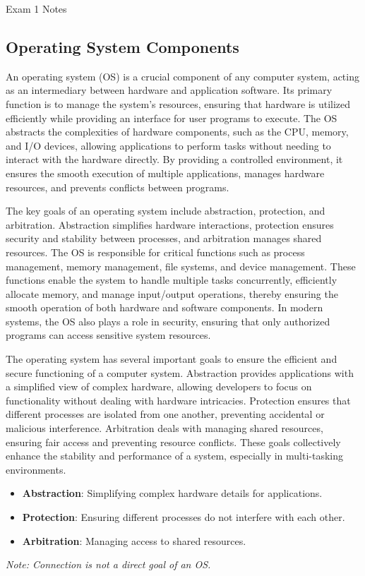 \begin{examnotes}{Exam 1 Notes}
    \subsection*{Operating System Components}

    An operating system (OS) is a crucial component of any computer system, acting as an intermediary between hardware and application software. Its primary function is to manage the system's 
    resources, ensuring that hardware is utilized efficiently while providing an interface for user programs to execute. The OS abstracts the complexities of hardware components, such as the CPU, 
    memory, and I/O devices, allowing applications to perform tasks without needing to interact with the hardware directly. By providing a controlled environment, it ensures the smooth execution 
    of multiple applications, manages hardware resources, and prevents conflicts between programs. 
    
    The key goals of an operating system include abstraction, protection, and arbitration. Abstraction simplifies hardware interactions, protection ensures security and stability between processes, 
    and arbitration manages shared resources. The OS is responsible for critical functions such as process management, memory management, file systems, and device management. These functions enable 
    the system to handle multiple tasks concurrently, efficiently allocate memory, and manage input/output operations, thereby ensuring the smooth operation of both hardware and software components. 
    In modern systems, the OS also plays a role in security, ensuring that only authorized programs can access sensitive system resources.
    
    \begin{highlight}[Goals of an OS]
        The operating system has several important goals to ensure the efficient and secure functioning of a computer system. Abstraction provides applications with a simplified view of complex hardware, 
        allowing developers to focus on functionality without dealing with hardware intricacies. Protection ensures that different processes are isolated from one another, preventing accidental or 
        malicious interference. Arbitration deals with managing shared resources, ensuring fair access and preventing resource conflicts. These goals collectively enhance the stability and performance 
        of a system, especially in multi-tasking environments.
        \begin{itemize}
            \item \textbf{Abstraction}: Simplifying complex hardware details for applications.
            \item \textbf{Protection}: Ensuring different processes do not interfere with each other.
            \item \textbf{Arbitration}: Managing access to shared resources.
        \end{itemize}
        \textit{Note: Connection is not a direct goal of an OS.}
    \end{highlight}
    

\end{examnotes}
